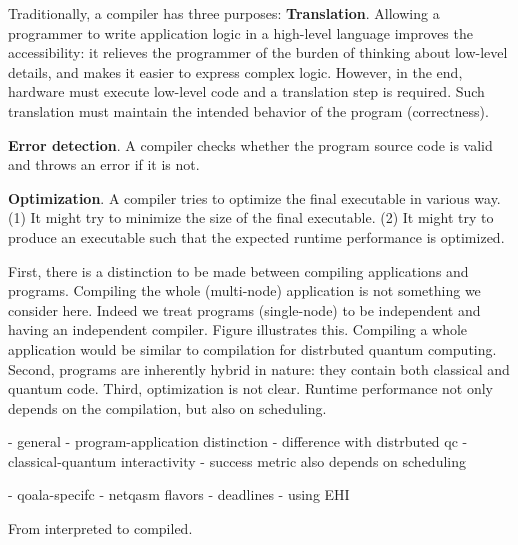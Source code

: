 Traditionally, a compiler has three purposes:
\textbf{Translation}. Allowing a programmer to write application logic in a high-level language improves the accessibility: it relieves the programmer of the burden of thinking about low-level details, and makes it easier to express complex logic. However, in the end, hardware must execute low-level code and a translation step is required. Such translation must maintain the intended behavior of the program (correctness).

\textbf{Error detection}. A compiler checks whether the program source code is valid and throws an error if it is not.

\textbf{Optimization}. A compiler tries to optimize the final executable in various way. (1) It might try to minimize the size of the final executable. (2) It might try to produce an executable such that the expected runtime performance is optimized.

First, there is a distinction to be made between compiling applications and programs.
Compiling the whole (multi-node) application is not something we consider here.
Indeed we treat programs (single-node) to be independent and having an independent compiler.
Figure  illustrates this.
Compiling a whole application would be similar to compilation for distrbuted quantum computing.
Second, programs are inherently hybrid in nature: they contain both classical and quantum code.
Third, optimization is not clear.
Runtime performance not only depends on the compilation, but also on scheduling.

- general
  - program-application distinction
  - difference with distrbuted qc
  - classical-quantum interactivity
  - success metric also depends on scheduling

- qoala-specifc
  - netqasm flavors
  - deadlines
  - using EHI

From interpreted to compiled.


